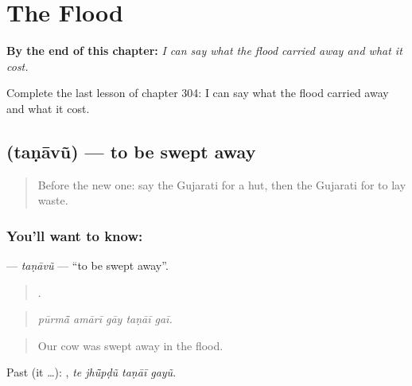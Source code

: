 
\chapter{The Flood}
\label{ch:gu-the-flood}

\begin{chapteropening}
\textbf{By the end of this chapter:} \emph{I can say what the flood carried away and what it cost.}

Complete the last lesson of chapter 304: I can say what the flood carried away and what it cost.
\end{chapteropening}

\section[\texorpdfstring{\gu{તણાવું} (taṇāvũ)}{તણાવું (taṇāvũ)}]{ (taṇāvũ) — to be swept away}

\label{lesson:GU-C304-tanavu}



\begin{quote}
Before the new one: say the Gujarati for a hut, then the Gujarati for to lay waste.
\end{quote}

\subsection*{You'll want to know: }
\textbf{} — \emph{taṇāvũ} — \textquotedblleft{}to be swept away\textquotedblright{}.

\begin{quote}
    .
\end{quote}

\begin{quote}
\emph{pūrmā̃ amārī gāy taṇāī gaī.}
\end{quote}

\begin{quote}
Our cow was swept away in the flood.
\end{quote}

Past (it …):    , \emph{te jhū̃pḍũ taṇāī gayũ}.

